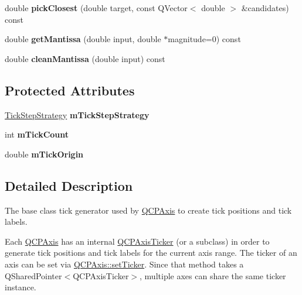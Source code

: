 \begin{DoxyCompactItemize}
double {\bfseries pick\+Closest} (double target, const Q\+Vector$<$ double $>$ \&candidates) const
\item 
\mbox{\label{class_q_c_p_axis_ticker_a2f1e223bafbf2cec7c3ba8b08d5c77e8}} 
double {\bfseries get\+Mantissa} (double input, double $\ast$magnitude=0) const
\item 
\mbox{\label{class_q_c_p_axis_ticker_ac7df6c72876b7abd67c932663a0b0f6a}} 
double {\bfseries clean\+Mantissa} (double input) const
\end{DoxyCompactItemize}
\subsection*{Protected Attributes}
\begin{DoxyCompactItemize}
\item 
\mbox{\label{class_q_c_p_axis_ticker_ac059d6d670b2f6132c593fb4de156701}} 
\mbox{\hyperlink{class_q_c_p_axis_ticker_ab6d2f9d9477821623ac9bc4b21ddf49a}{Tick\+Step\+Strategy}} {\bfseries m\+Tick\+Step\+Strategy}
\item 
\mbox{\label{class_q_c_p_axis_ticker_a14a35b47d1aad11b08d18ea0e25937b8}} 
int {\bfseries m\+Tick\+Count}
\item 
\mbox{\label{class_q_c_p_axis_ticker_a560ef9347b1aa599a9bf0e2f29d3ec16}} 
double {\bfseries m\+Tick\+Origin}
\end{DoxyCompactItemize}


\subsection{Detailed Description}
The base class tick generator used by \mbox{\hyperlink{class_q_c_p_axis}{Q\+C\+P\+Axis}} to create tick positions and tick labels. 

Each \mbox{\hyperlink{class_q_c_p_axis}{Q\+C\+P\+Axis}} has an internal \mbox{\hyperlink{class_q_c_p_axis_ticker}{Q\+C\+P\+Axis\+Ticker}} (or a subclass) in order to generate tick positions and tick labels for the current axis range. The ticker of an axis can be set via \mbox{\hyperlink{class_q_c_p_axis_a4ee03fcd2c74d05cd1a419b9af5cfbdc}{Q\+C\+P\+Axis\+::set\+Ticker}}. Since that method takes a {\ttfamily Q\+Shared\+Pointer$<$\+Q\+C\+P\+Axis\+Ticker$>$}, multiple axes can share the same ticker instance.

